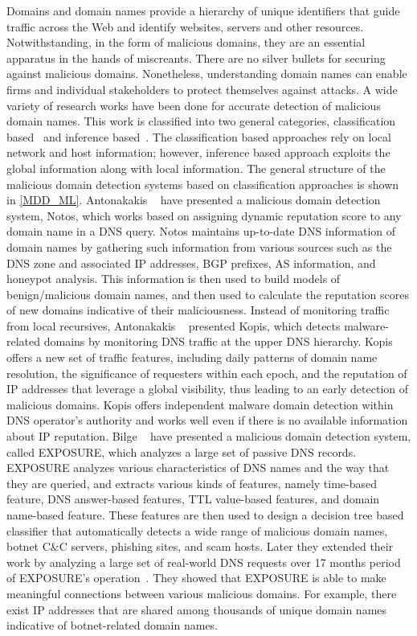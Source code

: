 \label{sec:MaliciousDomain}
Domains and domain names provide a hierarchy of unique identifiers that guide traffic across the Web and identify websites, servers and other resources. Notwithstanding, in the form of malicious domains, they are an essential apparatus in the hands of miscreants. There are no silver bullets for securing against malicious domains. Nonetheless, understanding domain names can enable firms and individual stakeholders to protect themselves against attacks. A wide variety of research works have been done for accurate detection of malicious domain names. 
This work is classified into two general categories, classification based~ and inference based~. The classification based approaches rely on local network and host information; however, inference based approach exploits the global information along with local information. The general structure of the malicious domain detection systems based on classification approaches is shown in \autoref{MDD_ML}.  
 Antonakakis \etal~ have presented a malicious domain detection system, Notos, which works based on assigning dynamic reputation score to any domain name in a DNS query. Notos maintains up-to-date DNS information of domain names by gathering such information from various sources such as the DNS zone and associated IP addresses, BGP prefixes, AS information, and honeypot analysis. This information is then used to build models of benign/malicious domain names, and then used to calculate the reputation scores of new domains indicative of their maliciousness. 
Instead of monitoring traffic from local recursives, Antonakakis \etal~ presented Kopis, which detects malware-related domains by monitoring DNS traffic at the upper DNS hierarchy. Kopis offers a new set of traffic features, including daily patterns of domain name resolution, the significance of requesters within each epoch, and the reputation of IP addresses that leverage a global visibility, thus leading to an early detection of malicious domains. Kopis offers independent malware domain detection within DNS operator's authority and works well even if there is no available information about IP reputation.
Bilge \etal~ have presented a malicious domain detection system, called EXPOSURE, which analyzes a large set of passive DNS records. EXPOSURE analyzes various characteristics of DNS names and the way that they are queried, and extracts various kinds of features, namely time-based feature, DNS answer-based features, TTL value-based features, and domain name-based feature. These features are then used to design a decision tree based classifier that automatically detects a wide range of malicious domain names, \eg botnet C\&C servers, phishing sites, and scam hosts. Later they extended their work by analyzing a large set of real-world DNS requests over 17 months period of EXPOSURE's operation~. They showed that EXPOSURE is able to make meaningful connections between various malicious domains. For example, there exist IP addresses that are shared among thousands of unique domain names indicative of botnet-related domain names. 

